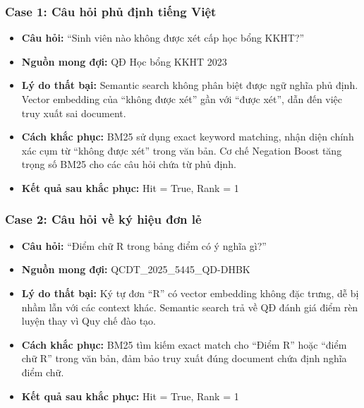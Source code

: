 \documentclass[../DoAn.tex]{subfiles}
\begin{document}
\subsubsection{Case 1: Câu hỏi phủ định tiếng Việt}
\begin{itemize}
    \item \textbf{Câu hỏi:} ``Sinh viên nào không được xét cấp học bổng KKHT?''
    \item \textbf{Nguồn mong đợi:} QĐ Học bổng KKHT 2023
    \item \textbf{Lý do thất bại:} Semantic search không phân biệt được ngữ nghĩa phủ định. Vector embedding của ``không được xét'' gần với ``được xét'', dẫn đến việc truy xuất sai document.
    \item \textbf{Cách khắc phục:} BM25 sử dụng exact keyword matching, nhận diện chính xác cụm từ ``không được xét'' trong văn bản. Cơ chế Negation Boost tăng trọng số BM25 cho các câu hỏi chứa từ phủ định.
    \item \textbf{Kết quả sau khắc phục:} Hit = True, Rank = 1
\end{itemize}

\subsubsection{Case 2: Câu hỏi về ký hiệu đơn lẻ}
\begin{itemize}
    \item \textbf{Câu hỏi:} ``Điểm chữ R trong bảng điểm có ý nghĩa gì?''
    \item \textbf{Nguồn mong đợi:} QCDT\_2025\_5445\_QD-DHBK
    \item \textbf{Lý do thất bại:} Ký tự đơn ``R'' có vector embedding không đặc trưng, dễ bị nhầm lẫn với các context khác. Semantic search trả về QĐ đánh giá điểm rèn luyện thay vì Quy chế đào tạo.
    \item \textbf{Cách khắc phục:} BM25 tìm kiếm exact match cho ``Điểm R'' hoặc ``điểm chữ R'' trong văn bản, đảm bảo truy xuất đúng document chứa định nghĩa điểm chữ.
    \item \textbf{Kết quả sau khắc phục:} Hit = True, Rank = 1
\end{itemize}
\end{document}

